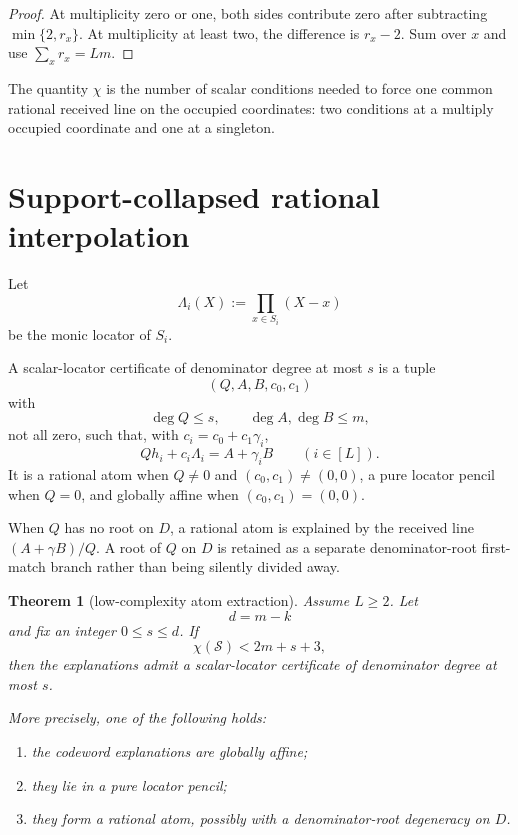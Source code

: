 \documentclass[11pt,a4paper]{amsart}
\numberwithin{equation}{section}
\newtheorem{theorem}{Theorem}[section]
\theoremstyle{remark}
\newcommand{\cS}{\mathcal S}\newcommand{\cZ}{\mathcal Z}
\begin{document}
\begin{proof}
At multiplicity zero or one, both sides contribute zero after subtracting $\min\{2,r_x\}$.  At multiplicity at least two, the difference is $r_x-2$.  Sum over $x$ and use $\sum_xr_x=Lm$.
\end{proof}

The quantity $\chi$ is the number of scalar conditions needed to force one common rational received line on the occupied coordinates: two conditions at a multiply occupied coordinate and one at a singleton.

\section{Support-collapsed rational interpolation}

Let
\[
 \Lambda_i(X):=\prod_{x\in S_i}(X-x)
\]
be the monic locator of $S_i$.

\begin{definition}\label{def:certificate}
A scalar-locator certificate of denominator degree at most $s$ is a tuple
\[
 (Q,A,B,c_0,c_1)
\]
with
\[
 \deg Q\le s,
 \qquad
 \deg A,\deg B\le m,
\]
not all zero, such that, with $c_i=c_0+c_1\gamma_i$,
\[
 \boxed{
 Qh_i+c_i\Lambda_i=A+\gamma_iB
 \qquad(i\in[L]).
 }
\]
It is a rational atom when $Q\ne0$ and $(c_0,c_1)\ne(0,0)$, a pure locator pencil when $Q=0$, and globally affine when $(c_0,c_1)=(0,0)$.
\end{definition}

When $Q$ has no root on $D$, a rational atom is explained by the received line $(A+\gamma B)/Q$.  A root of $Q$ on $D$ is retained as a separate denominator-root first-match branch rather than being silently divided away.

\begin{theorem}[low-complexity atom extraction]\label{thm:atom-extraction}
Assume $L\ge2$.  Let
\[
 d=m-k
\]
and fix an integer $0\le s\le d$.  If
\[
 \boxed{
 \chi(\cS)<2m+s+3,
 }
\]
then the explanations admit a scalar-locator certificate of denominator degree at most $s$.

More precisely, one of the following holds:
\begin{enumerate}[label=\textup{(\roman*)}]
\item the codeword explanations are globally affine;
\item they lie in a pure locator pencil;
\item they form a rational atom, possibly with a denominator-root degeneracy on $D$.
\end{enumerate}
\end{theorem}
\end{document}
